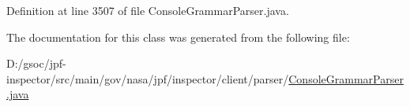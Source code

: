 Definition at line 3507 of file Console\+Grammar\+Parser.\+java.



The documentation for this class was generated from the following file\+:\begin{DoxyCompactItemize}
\item 
D\+:/gsoc/jpf-\/inspector/src/main/gov/nasa/jpf/inspector/client/parser/\hyperlink{_console_grammar_parser_8java}{Console\+Grammar\+Parser.\+java}\end{DoxyCompactItemize}

